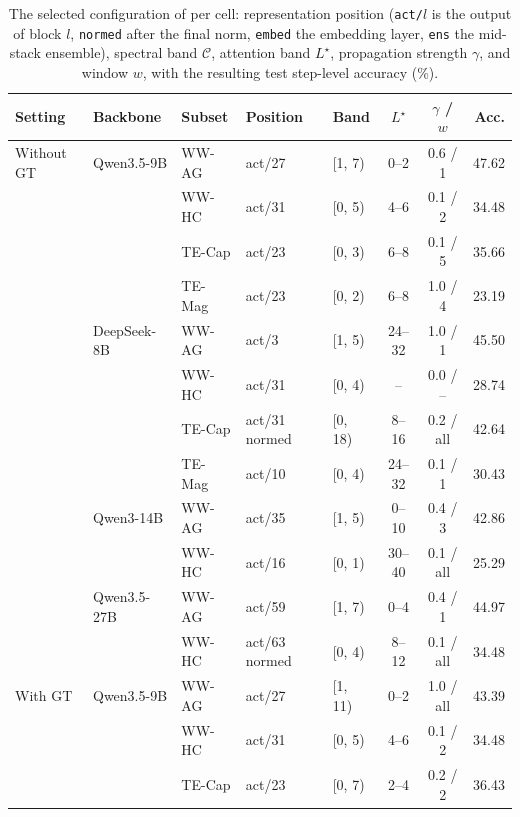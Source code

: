 \begin{table}[h]
\centering
\footnotesize
\setlength{\tabcolsep}{4pt}
\caption{The selected configuration of \soap{} per cell: representation position
(\texttt{act/}$l$ is the output of block $l$, \texttt{normed} after the final norm,
\texttt{embed} the embedding layer, \texttt{ens} the mid-stack ensemble), spectral
band $\mathcal{C}$, attention band $L^\star$, propagation strength $\gamma$, and
window $w$, with the resulting test step-level accuracy (\%).}
\label{tab:anchors}
\begin{tabular}{l l l l l c c r}
\toprule
Setting & Backbone & Subset & Position & Band & $L^\star$ & $\gamma$ / $w$ & Acc. \\
\midrule
Without GT & Qwen3.5-9B  & WW-AG  & act/27 & [1, 7)  & 0--2   & 0.6 / 1   & 47.62 \\
           &             & WW-HC  & act/31 & [0, 5)  & 4--6   & 0.1 / 2   & 34.48 \\
           &             & TE-Cap & act/23 & [0, 3)  & 6--8   & 0.1 / 5   & 35.66 \\
           &             & TE-Mag & act/23 & [0, 2)  & 6--8   & 1.0 / 4   & 23.19 \\
           & DeepSeek-8B & WW-AG  & act/3  & [1, 5)  & 24--32 & 1.0 / 1   & 45.50 \\
           &             & WW-HC  & act/31 & [0, 4)  & --     & 0.0 / --  & 28.74 \\
           &             & TE-Cap & act/31 normed & [0, 18) & 8--16 & 0.2 / all & 42.64 \\
           &             & TE-Mag & act/10 & [0, 4)  & 24--32 & 0.1 / 1   & 30.43 \\
           & Qwen3-14B   & WW-AG  & act/35 & [1, 5)  & 0--10  & 0.4 / 3   & 42.86 \\
           &             & WW-HC  & act/16 & [0, 1)  & 30--40 & 0.1 / all & 25.29 \\
           & Qwen3.5-27B & WW-AG  & act/59 & [1, 7)  & 0--4   & 0.4 / 1   & 44.97 \\
           &             & WW-HC  & act/63 normed & [0, 4) & 8--12 & 0.1 / all & 34.48 \\
\midrule
With GT    & Qwen3.5-9B  & WW-AG  & act/27 & [1, 11) & 0--2   & 1.0 / all & 43.39 \\
           &             & WW-HC  & act/31 & [0, 5)  & 4--6   & 0.1 / 2   & 34.48 \\
           &             & TE-Cap & act/23 & [0, 7)  & 2--4   & 0.2 / 2   & 36.43 \\

\end{tabular}
\end{table}

